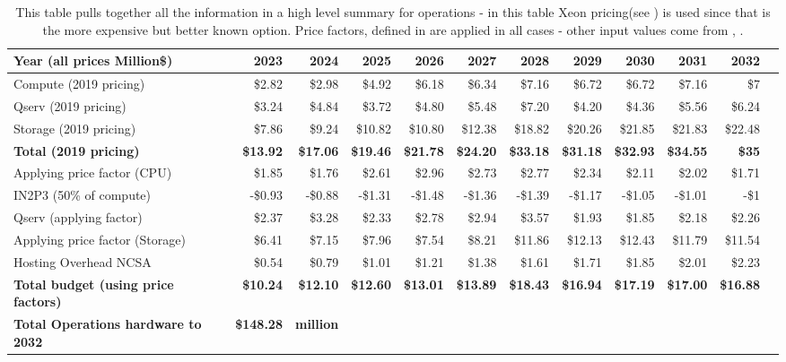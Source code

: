\tiny \begin{longtable} { |p{}  |r  |r  |r  |r  |r  |r  |r  |r  |r  |r  |r |} 
\caption{This table pulls together all the information in a high level summary for operations - in this table Xeon pricing(see ) is used since that is the more expensive but better known option. Price factors, defined in  are applied in all cases - other input values come from , .
 \label{tab:opsSummary}}\\ 
\hline 
\textbf{Year  (all prices Million\$)}&\textbf{2023}&\textbf{2024}&\textbf{2025}&\textbf{2026}&\textbf{2027}&\textbf{2028}&\textbf{2029}&\textbf{2030}&\textbf{2031}&\textbf{2032} \\ \hline
{Compute (2019 pricing)}&{\$2.82}&{\$2.98}&{\$4.92}&{\$6.18}&{\$6.34}&{\$7.16}&{\$6.72}&{\$6.72}&{\$7.16}&{\$7} \\ \hline
{Qserv (2019 pricing)}&{\$3.24}&{\$4.84}&{\$3.72}&{\$4.80}&{\$5.48}&{\$7.20}&{\$4.20}&{\$4.36}&{\$5.56}&{\$6.24} \\ \hline
{Storage (2019 pricing)}&{\$7.86}&{\$9.24}&{\$10.82}&{\$10.80}&{\$12.38}&{\$18.82}&{\$20.26}&{\$21.85}&{\$21.83}&{\$22.48} \\ \hline
\textbf{Total (2019 pricing)}&\textbf{\$13.92}&\textbf{\$17.06}&\textbf{\$19.46}&\textbf{\$21.78}&\textbf{\$24.20}&\textbf{\$33.18}&\textbf{\$31.18}&\textbf{\$32.93}&\textbf{\$34.55}&\textbf{\$35} \\ \hline
{Applying price factor (CPU)}&{\$1.85}&{\$1.76}&{\$2.61}&{\$2.96}&{\$2.73}&{\$2.77}&{\$2.34}&{\$2.11}&{\$2.02}&{\$1.71} \\ \hline
{IN2P3 (50\% of compute)}&{-\$0.93}&{-\$0.88}&{-\$1.31}&{-\$1.48}&{-\$1.36}&{-\$1.39}&{-\$1.17}&{-\$1.05}&{-\$1.01}&{-\$1} \\ \hline
{Qserv (applying factor)}&{\$2.37}&{\$3.28}&{\$2.33}&{\$2.78}&{\$2.94}&{\$3.57}&{\$1.93}&{\$1.85}&{\$2.18}&{\$2.26} \\ \hline
{Applying price factor (Storage)}&{\$6.41}&{\$7.15}&{\$7.96}&{\$7.54}&{\$8.21}&{\$11.86}&{\$12.13}&{\$12.43}&{\$11.79}&{\$11.54} \\ \hline
{Hosting Overhead NCSA
}&{\$0.54}&{\$0.79}&{\$1.01}&{\$1.21}&{\$1.38}&{\$1.61}&{\$1.71}&{\$1.85}&{\$2.01}&{\$2.23} \\ \hline
\textbf{Total budget (using price factors)}&\textbf{\$10.24}&\textbf{\$12.10}&\textbf{\$12.60}&\textbf{\$13.01}&\textbf{\$13.89}&\textbf{\$18.43}&\textbf{\$16.94}&\textbf{\$17.19}&\textbf{\$17.00}&\textbf{\$16.88} \\ \hline
\textbf{Total Operations hardware to 2032 }&\textbf{\$148.28}&\textbf{million}&&&&&&&& \\ \hline
\end{longtable} \normalsize
